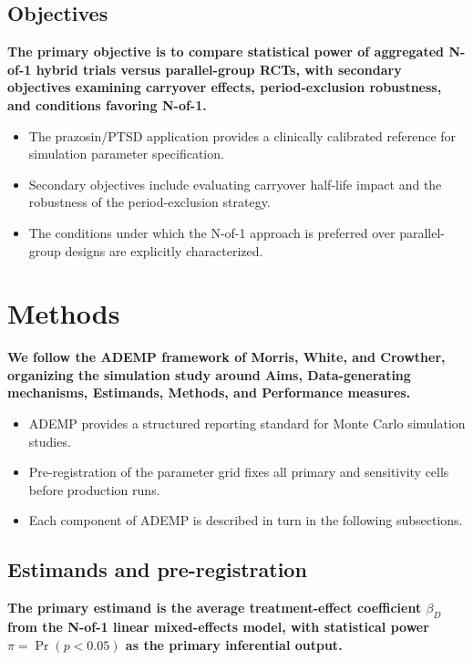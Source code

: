 \documentclass[
  11pt,
]{article}
\begin{document}
\subsection{Objectives}\label{objectives}

\textbf{The primary objective is to compare statistical power of aggregated N-of-1 hybrid trials versus parallel-group RCTs, with secondary objectives examining carryover effects, period-exclusion robustness, and conditions favoring N-of-1.}

\begin{itemize}\setlength{\itemsep}{2pt}\setlength{\parskip}{0pt}
\item The prazosin/PTSD application provides a clinically calibrated reference for simulation parameter specification.
\item Secondary objectives include evaluating carryover half-life impact and the robustness of the period-exclusion strategy.
\item The conditions under which the N-of-1 approach is preferred over parallel-group designs are explicitly characterized.
\end{itemize}

\section{Methods}\label{methods}

\textbf{We follow the ADEMP framework of Morris, White, and Crowther, organizing the simulation study around Aims, Data-generating mechanisms, Estimands, Methods, and Performance measures.}

\begin{itemize}\setlength{\itemsep}{2pt}\setlength{\parskip}{0pt}
\item ADEMP provides a structured reporting standard for Monte Carlo simulation studies.
\item Pre-registration of the parameter grid fixes all primary and sensitivity cells before production runs.
\item Each component of ADEMP is described in turn in the following subsections.
\end{itemize}

\subsection{Estimands and pre-registration}\label{estimands-and-pre-registration}

\textbf{The primary estimand is the average treatment-effect coefficient $\beta_D$ from the N-of-1 linear mixed-effects model, with statistical power $\pi = \Pr(p < 0.05)$ as the primary inferential output.}
\end{document}
